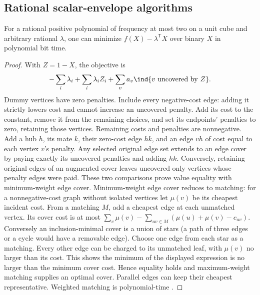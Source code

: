 \subsection{Rational scalar-envelope algorithms}
\begin{proposition}\label{prop:edge-cover-oracle}
For a rational positive polynomial of frequency at most two on a unit
cube and arbitrary rational $\lambda$, one can minimize
$f(X)-\lambda^{\mathsf T}X$ over binary $X$ in polynomial bit time.
\end{proposition}
\begin{proof}
With $Z=1-X$, the objective is
\[
 -\sum_i\lambda_i+\sum_i\lambda_iZ_i+
                     \sum_v a_v\ind\{v\text{ uncovered by }Z\}.
\]
Dummy vertices have zero penalties. Include every negative-cost edge:
adding it strictly lowers cost and cannot increase an uncovered penalty.
Add its cost to the constant, remove it from the remaining choices, and
set its endpoints' penalties to zero, retaining those vertices. Remaining
costs and penalties are nonnegative. Add a hub $h$, its mate $k$, their
zero-cost edge $hk$, and an edge $vh$ of cost equal to each vertex $v$'s
penalty. Any selected original edge set extends to an edge cover by
paying exactly its uncovered penalties and adding $hk$. Conversely,
retaining original edges of an augmented cover leaves uncovered only
vertices whose penalty edges were paid. These two comparisons prove
value equality with minimum-weight edge cover.
Minimum-weight edge cover reduces to matching: for a nonnegative-cost graph
without isolated vertices let $\mu(v)$ be its cheapest incident cost.
From a matching $M$, add a cheapest edge at each unmatched vertex. Its
cover cost is at most
$\sum_v\mu(v)-\sum_{uv\in M}(\mu(u)+\mu(v)-c_{uv})$.
Conversely an inclusion-minimal cover is a union of stars (a path of
three edges or a cycle would have a removable edge). Choose one edge
from each star as a matching. Every other edge can be charged to its
unmatched leaf, with $\mu(v)$ no larger than its cost. This shows the
minimum of the displayed expression is no larger than the minimum cover
cost. Hence equality holds and maximum-weight matching supplies an
optimal cover. Parallel edges can keep their cheapest representative.
Weighted matching is polynomial-time \citep{Edmonds1965}.
\end{proof}

